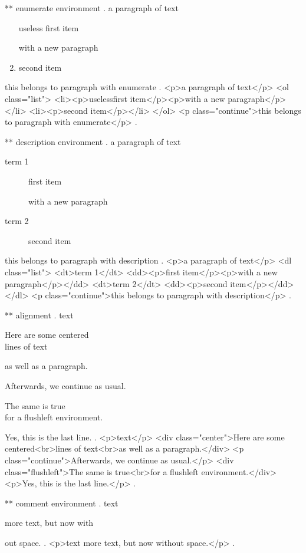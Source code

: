 ** enumerate environment
.
a paragraph of text

\begin{enumerate}
    \item[useless] first item

        with a new paragraph
    \item second item
\end{enumerate}
this belongs to paragraph with enumerate
.
<p>a paragraph of text</p>
<ol class="list">
<li><p>uselessﬁrst item</p><p>with a new paragraph</p></li>
<li><p>second item</p></li>
</ol>
<p class="continue">this belongs to paragraph with enumerate</p>
.


** description environment
.
a paragraph of text

\begin{description}
    \item[term 1] first item

        with a new paragraph
    \item[term 2] second item
\end{description}
this belongs to paragraph with description
.
<p>a paragraph of text</p>
<dl class="list">
<dt>term 1</dt>
<dd><p>ﬁrst item</p><p>with a new paragraph</p></dd>
<dt>term 2</dt>
<dd><p>second item</p></dd>
</dl>
<p class="continue">this belongs to paragraph with description</p>
.


** alignment
.
text
\begin{center}
    Here are some centered\\
    lines of text

    as well as a paragraph.
\end{center}
Afterwards, we continue as usual.
\begin{flushleft}
    The same is true\\
    for a flushleft environment.
\end{flushleft}

Yes, this is the last line.
.
<p>text</p>
<div class="center">Here are some centered<br>lines of text<br>as well as a paragraph.</div>
<p class="continue">Afterwards, we continue as usual.</p>
<div class="flushleft">The same is true<br>for a ﬂushleft environment.</div>
<p>Yes, this is the last line.</p>
.



** comment environment
.
text
\begin{comment}
    This is a comment.
    \end{comment
    still more comment.
\end{comment}
more text, but now with%
\begin{comment}
    This is a comment.
\end{comment}
out space.
.
<p>text more text, but now without space.</p>
.